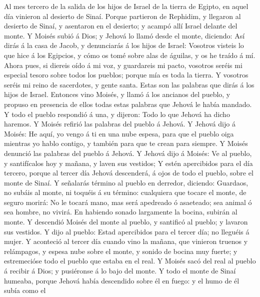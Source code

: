  Al mes tercero de la salida de los hijos de Israel de la
tierra de Egipto, en aquel día vinieron al desierto de Sinaí.
 Porque partieron de Rephidim, y llegaron al desierto de
Sinaí, y asentaron en el desierto; y acampó allí Israel delante del
monte.  Y Moisés subió á Dios; y Jehová lo llamó desde el
monte, diciendo: Así dirás á la casa de Jacob, y denunciarás á los hijos
de Israel:  Vosotros visteis lo que hice á los Egipcios, y
cómo os tomé sobre alas de águilas, y os he traído á mí. 
Ahora pues, si diereis oído á mi voz, y guardareis mi pacto, vosotros
seréis mi especial tesoro sobre todos los pueblos; porque mía es toda la
tierra.  Y vosotros seréis mi reino de sacerdotes, y gente
santa. Estas son las palabras que dirás á los hijos de Israel.
 Entonces vino Moisés, y llamó á los ancianos del pueblo,
y propuso en presencia de ellos todas estas palabras que Jehová le había
mandado.  Y todo el pueblo respondió á una, y dijeron:
Todo lo que Jehová ha dicho haremos. Y Moisés refirió las palabras del
pueblo á Jehová.  Y Jehová dijo á Moisés: He aquí, yo
vengo á ti en una nube espesa, para que el pueblo oiga mientras yo hablo
contigo, y también para que te crean para siempre. Y Moisés denunció las
palabras del pueblo á Jehová.  Y Jehová dijo á Moisés: Ve
al pueblo, y santifícalos hoy y mañana, y laven sus vestidos;
 Y estén apercibidos para el día tercero, porque al
tercer día Jehová descenderá, á ojos de todo el pueblo, sobre el monte
de Sinaí.  Y señalarás término al pueblo en derredor,
diciendo: Guardaos, no subáis al monte, ni toquéis á su término:
cualquiera que tocare el monte, de seguro morirá:  No le
tocará mano, mas será apedreado ó asaeteado; sea animal ó sea hombre, no
vivirá. En habiendo sonado largamente la bocina, subirán al monte.
 Y descendió Moisés del monte al pueblo, y santificó al
pueblo; y lavaron sus vestidos.  Y dijo al pueblo: Estad
apercibidos para el tercer día; no lleguéis á mujer.  Y
aconteció al tercer día cuando vino la mañana, que vinieron truenos y
relámpagos, y espesa nube sobre el monte, y sonido de bocina muy fuerte;
y estremecióse todo el pueblo que estaba en el real.  Y
Moisés sacó del real al pueblo á recibir á Dios; y pusiéronse á lo bajo
del monte.  Y todo el monte de Sinaí humeaba, porque
Jehová había descendido sobre él en fuego: y el humo de él subía como el
